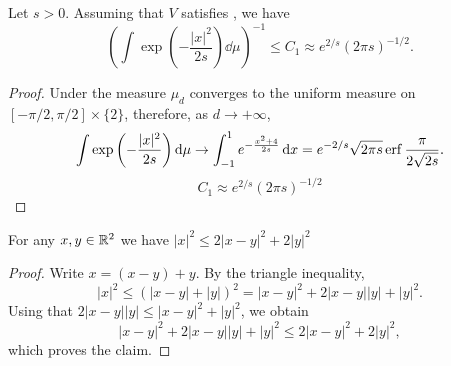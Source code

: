 \begin{lemma}
    Let $s > 0$. Assuming that $V$ satisfies , we have 
    \[
        \left(\int \exp\left(-\frac{|x|^2}{2s}\right) \dd{\mu}\right)^{-1} \le C_1 \approx e^{2/s} (2\pi s)^{-1/2}.
    \]
\end{lemma}
\begin{proof}
Under  the measure $\mu_d$ converges to the uniform measure on \( [-\pi/2,\pi/2] \times \{2\} \), therefore, as $d \to +\infty$, 
    \begin{equation}
        \int \exp\left(-\frac{|x|^2}{2s}\right) \dd{\mu} \to \int_{-1}^1 e^{-\frac{x^2+4}{2s}} \dd{x} = e^{-2/s}\sqrt{2\pi s} \erf{\frac{\pi}{2 \sqrt{2s}}}.
    \end{equation}
    \begin{equation}
        C_1 \approx e^{2/s} (2\pi s)^{-1/2}
    \end{equation}
\end{proof}


\begin{lemma}\label{lem:x_sq_le}
    For any \( x,y \in \mathbb{R}^2 \) we have $|x|^2 \le 2|x-y|^2 + 2|y|^2$
\end{lemma}
\begin{proof}
    Write \( x = (x-y) + y \). By the triangle inequality,
    \[
        |x|^2 \le (|x-y| + |y|)^2 = |x-y|^2 + 2|x-y| |y| + |y|^2.
    \]
    Using that \( 2|x-y||y| \le |x-y|^2 + |y|^2 \), we obtain
    \[
        |x-y|^2 + 2|x-y| |y| + |y|^2 \le 2|x-y|^2 + 2|y|^2,
    \]
    which proves the claim.
\end{proof}

